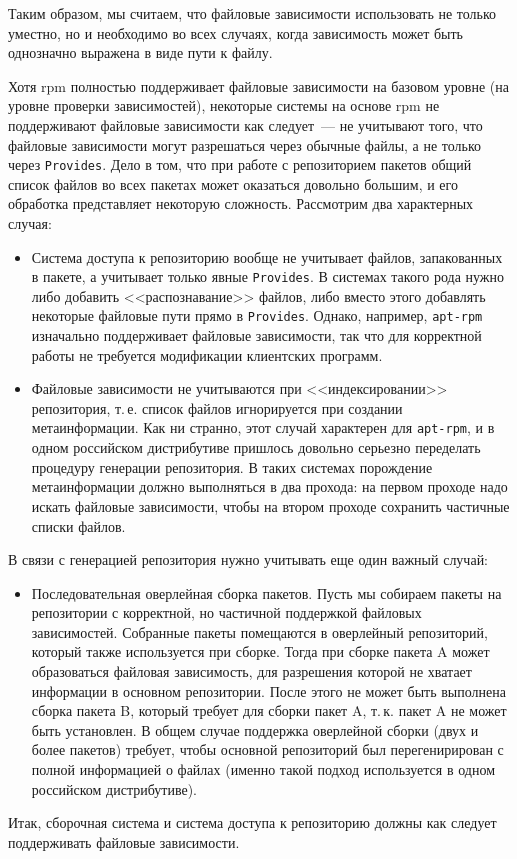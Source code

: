 \documentclass[russian,a4paper,12pt,titlepage]{article}
\begin{document}
Таким образом, мы считаем, что файловые зависимости использовать не только уместно, но и необходимо во всех случаях,
когда зависимость может быть однозначно выражена в виде пути к файлу.

Хотя rpm полностью поддерживает файловые зависимости на базовом уровне (на уровне проверки зависимостей),
некоторые системы на основе rpm не поддерживают файловые зависимости как следует~--- не учитывают того,
что файловые зависимости могут разрешаться через обычные файлы, а не только через \verb|Provides|.
Дело в том, что при работе с репозиторием пакетов общий список файлов во всех пакетах может оказаться
довольно большим, и его обработка представляет некоторую сложность.  Рассмотрим два характерных случая:
\begin{itemize}
\item Система доступа к репозиторию вообще не учитывает файлов, запакованных в пакете, а учитывает только явные \verb|Provides|.
В системах такого рода нужно либо добавить <<распознавание>> файлов, либо вместо этого добавлять некоторые файловые пути прямо
в \verb|Provides|.  Однако, например, \verb|apt-rpm| изначально поддерживает файловые зависимости, так что для корректной работы
не требуется модификации клиентских программ.
\item Файловые зависимости не учитываются при <<индексировании>> репозитория, т.\,е. список файлов игнорируется при создании
метаинформации.  Как ни странно, этот случай характерен для \verb|apt-rpm|, и в одном российском дистрибутиве пришлось довольно
серьезно переделать процедуру генерации репозитория.  В таких системах порождение метаинформации должно выполняться в два
прохода: на первом проходе надо искать файловые зависимости, чтобы на втором проходе сохранить частичные списки файлов.
\end{itemize}
В связи с генерацией репозитория нужно учитывать еще один важный случай:
\begin{itemize}
\item Последовательная оверлейная сборка пакетов.  Пусть мы собираем пакеты на репозитории с корректной, но частичной
поддержкой файловых зависимостей.  Собранные пакеты помещаются в оверлейный репозиторий, который также используется
при сборке.  Тогда при сборке пакета A может образоваться файловая зависимость, для разрешения которой не хватает информации
в основном репозитории.  После этого не может быть выполнена сборка пакета B, который требует для сборки пакет A,
т.\,к. пакет A не может быть установлен.  В общем случае поддержка оверлейной сборки (двух и более пакетов) требует,
чтобы основной репозиторий был перегенирирован с полной информацией о файлах (именно такой подход используется в одном
российском дистрибутиве).
\end{itemize}
Итак, сборочная система и система доступа к репозиторию должны как следует поддерживать файловые зависимости.
\end{document}
